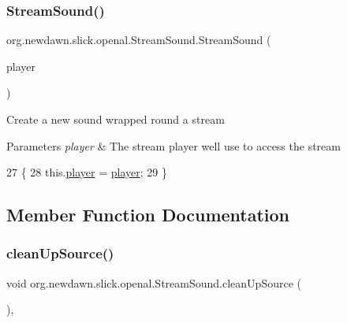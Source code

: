\subsubsection{\texorpdfstring{Stream\+Sound()}{StreamSound()}}
{\footnotesize\ttfamily org.\+newdawn.\+slick.\+openal.\+Stream\+Sound.\+Stream\+Sound (\begin{DoxyParamCaption}\item[{\mbox{\hyperlink{classorg_1_1newdawn_1_1slick_1_1openal_1_1_open_a_l_stream_player}{Open\+A\+L\+Stream\+Player}}}]{player }\end{DoxyParamCaption})\hspace{0.3cm}{\ttfamily [inline]}}

Create a new sound wrapped round a stream


\begin{DoxyParams}{Parameters}
{\em player} & The stream player we\textquotesingle{}ll use to access the stream \\
\hline
\end{DoxyParams}

\begin{DoxyCode}
27                                                   \{
28         this.\mbox{\hyperlink{classorg_1_1newdawn_1_1slick_1_1openal_1_1_stream_sound_a5e4d0d6e22af804ce94996f6ab90872f}{player}} = \mbox{\hyperlink{classorg_1_1newdawn_1_1slick_1_1openal_1_1_stream_sound_a5e4d0d6e22af804ce94996f6ab90872f}{player}};
29     \}
\end{DoxyCode}


\subsection{Member Function Documentation}
\mbox{\label{classorg_1_1newdawn_1_1slick_1_1openal_1_1_stream_sound_aa5c0c9541188f59c8786852419f9c7c2}} 
\subsubsection{\texorpdfstring{clean\+Up\+Source()}{cleanUpSource()}}
{\footnotesize\ttfamily void org.\+newdawn.\+slick.\+openal.\+Stream\+Sound.\+clean\+Up\+Source (\begin{DoxyParamCaption}{ }\end{DoxyParamCaption})\hspace{0.3cm}{\ttfamily [inline]}, {\ttfamily [private]}}

